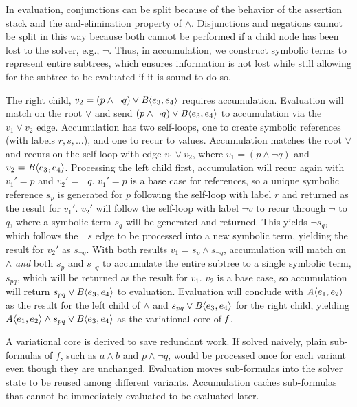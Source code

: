 In evaluation, conjunctions can be split because of the behavior of the
assertion stack and the and-elimination property of $\wedge$. Disjunctions and
negations cannot be split in this way because both cannot be performed if a
child node has been lost to the solver, e.g., $\neg \unit{}$. Thus, in
accumulation, we construct symbolic terms to represent entire subtrees, which
ensures information is not lost while still allowing for the subtree to be
evaluated if it is sound to do so.

The right child, $v_2=(p\wedge \neg q) \vee \chc[B]{e_3, e_4}$ requires
accumulation. Evaluation will match on the root $\vee$ and send $(p\wedge \neg
q) \vee \chc[B]{e_3, e_4}$ to accumulation via the $v_{1} \vee v_{2}$ edge.
Accumulation has two self-loops, one to create symbolic references (with labels
$r, s, \hdots$), and one to recur to values. Accumulation matches the root
$\vee$ and recurs on the self-loop with edge $v_{1} \vee v_{2}$, where $v_{1} =
(p\wedge \neg q)$ and $v_{2} = \chc[B]{e_3, e_4}$. Processing the left child
first, accumulation will recur again with $v_{1}' = p$ and $v_{2}' = \neg q$.
$v_{1}' = p$ is a base case for references, so a unique symbolic reference
$s_{p}$ is generated for $p$ following the self-loop with label $r$ and
returned as the result for $v_{1}'$. $v_{2}'$ will follow the self-loop with
label $\neg v$ to recur through $\neg$ to $q$, where a symbolic term $s_{q}$
will be generated and returned. This yields $\neg s_{q}$, which follows the
$\neg s$ edge to be processed into a new symbolic term, yielding the result for
$v_{2}'$ as $s_{\neg q}$. With both results $v_{1} = s_{p}\wedge s_{\neg q}$,
accumulation will match on $\wedge$ \emph{and} both $s_{p}$ and $s_{\neg q}$ to
accumulate the entire subtree to a single symbolic term, $s_{pq}$, which will
be returned as the result for $v_{1}$. $v_{2}$ is a base case, so accumulation
will return $s_{pq} \vee \chc[B]{e_3, e_4}$ to evaluation. Evaluation will
conclude with $\chc[A]{e_1,e_2}$ as the result for the left child of $\wedge$
and $s_{pq} \vee \chc[B]{e_3, e_4}$ for the right child, yielding
$\chc[A]{e_1,e_2} \wedge s_{pq} \vee \chc[B]{e_3, e_4}$ as the variational core
of $\mathit{f}$.

A variational core is derived to save redundant work.
%
If solved naively, plain sub-formulas of $f$, such as $a \wedge b$ and $p
\wedge \neg q$, would be processed once for each variant even though they are
unchanged. Evaluation moves sub-formulas into the solver state to be reused
among different variants. Accumulation caches sub-formulas that cannot be
immediately evaluated to be evaluated later.


